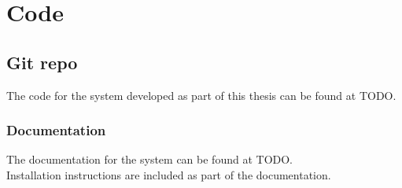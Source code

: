 \chapter{Code}
\section{Git repo}
The code for the system developed as part of this thesis can be found at TODO.

\subsection{Documentation}
The documentation for the system can be found at TODO.\\
Installation instructions are included as part of the documentation.
